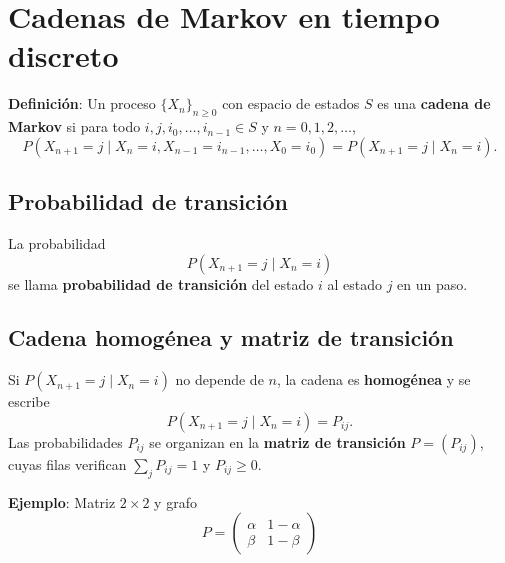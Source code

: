 \documentclass[12pt,a4paper]{article}
\begin{document}
\section{Cadenas de Markov en tiempo discreto}
\textbf{Definición}: Un proceso $\{X_n\}_{n\ge 0}$ con espacio de estados $S$ es una \textbf{cadena de Markov} si para todo
$i,j,i_0,\ldots,i_{n-1}\in S$ y $n=0,1,2,\ldots$,
\begin{equation*}
P(X_{n+1}=j \mid X_n=i, X_{n-1}=i_{n-1},\ldots,X_0=i_0)
= P(X_{n+1}=j \mid X_n=i).
\end{equation*}

\subsection*{Probabilidad de transición}
La probabilidad
\begin{equation*}
P(X_{n+1}=j \mid X_n=i)
\end{equation*}
se llama \textbf{probabilidad de transición} del estado $i$ al estado $j$ en un paso.

\subsection*{Cadena homogénea y matriz de transición}
Si $P(X_{n+1}=j \mid X_n=i)$ no depende de $n$, la cadena es \textbf{homogénea} y se escribe
\begin{equation*}
P(X_{n+1}=j \mid X_n=i)=P_{ij}.
\end{equation*}
Las probabilidades $P_{ij}$ se organizan en la \textbf{matriz de transición} $P=(P_{ij})$, cuyas filas verifican
$\sum_j P_{ij}=1$ y $P_{ij}\ge 0$.

\textbf{Ejemplo}: Matriz $2\times 2$ y grafo
\begin{equation*}
P=\begin{pmatrix}
\alpha & 1-\alpha\\
\beta & 1-\beta
\end{pmatrix}
\end{equation*}
\begin{center}
\end{center}
\end{document}
